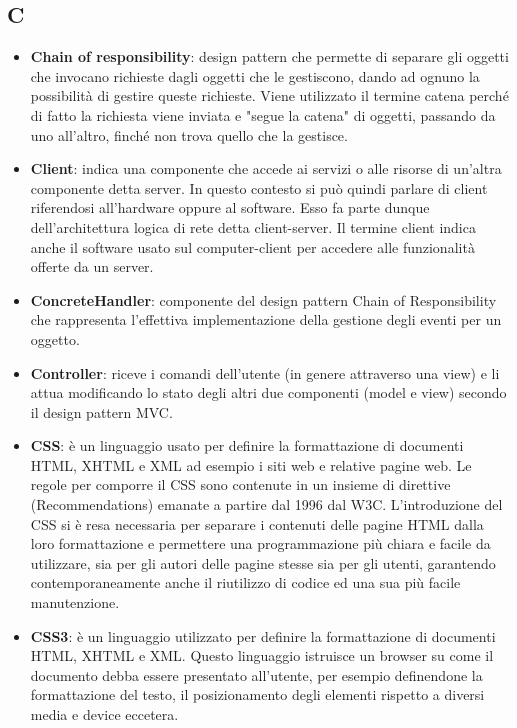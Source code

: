 \subsection{C}
\begin{itemize}
	\item
	\textbf{Chain of responsibility}: design pattern che permette di separare gli oggetti che invocano richieste dagli oggetti che le gestiscono, dando ad ognuno la possibilità di gestire queste richieste. Viene utilizzato il termine catena perché di fatto la richiesta viene inviata e "segue la catena" di oggetti, passando da uno all'altro, finché non trova quello che la gestisce.
	\item
	\textbf{Client}: indica una componente che accede ai servizi o alle risorse di un'altra componente detta server. In questo contesto si può quindi parlare di client riferendosi all'hardware oppure al software. Esso fa parte dunque dell'architettura logica di rete detta client-server.
	Il termine client indica anche il software usato sul computer-client per accedere alle funzionalità offerte da un server.
	\item
	\textbf{ConcreteHandler}:  componente del design pattern Chain of Responsibility che rappresenta l'effettiva implementazione della gestione degli eventi per un oggetto.
	\item
	\textbf{Controller}: riceve i comandi dell'utente (in genere attraverso una view) e li attua modificando lo stato degli altri due componenti (model e view) secondo il design pattern MVC. 
	\item
	\textbf{CSS}: è un linguaggio usato per definire la formattazione di documenti HTML, XHTML e XML ad esempio i siti web e relative pagine web. Le regole per comporre il CSS sono contenute in un insieme di direttive (Recommendations) emanate a partire dal 1996 dal W3C.
	L'introduzione del CSS si è resa necessaria per separare i contenuti delle pagine HTML dalla loro formattazione e permettere una programmazione più chiara e facile da utilizzare, sia per gli autori delle pagine stesse sia per gli utenti, garantendo contemporaneamente anche il riutilizzo di codice ed una sua più facile manutenzione. 
	\item
	\textbf{CSS3}: è un linguaggio utilizzato per definire la formattazione di documenti HTML, XHTML e XML.
	Questo linguaggio istruisce un browser su come il documento debba essere presentato all'utente, per esempio definendone la formattazione del testo, il posizionamento degli elementi rispetto a diversi media e device eccetera.
\end{itemize}